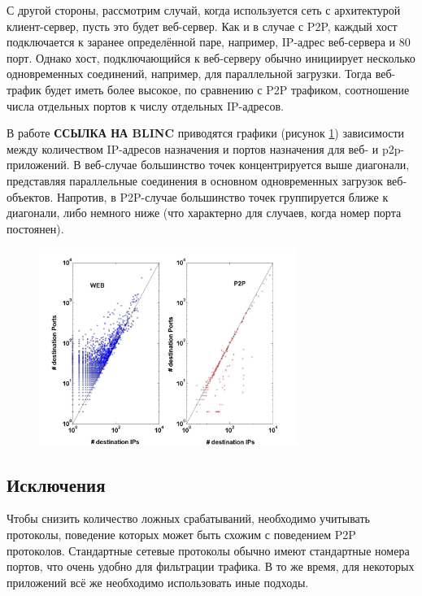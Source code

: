 \documentclass[bachelor, och, coursework]{SCWorks}
\begin{document}
С другой стороны, рассмотрим случай, когда используется сеть с архитектурой клиент-сервер, пусть это будет веб-сервер. Как и в случае с P2P, каждый хост подключается к заранее определённой паре, например, IP-адрес веб-сервера и 80 порт. Однако хост, подключающийся к веб-серверу обычно инициирует несколько одновременных соединений, например, для параллельной загрузки. Тогда веб-трафик будет иметь более высокое, по сравнению с P2P трафиком, соотношение числа отдельных портов к числу отдельных IP-адресов.

В работе \textbf{ССЫЛКА НА BLINC} приводятся графики (рисунок \ref{IPPort4.jpg}) зависимости между количеством IP-адресов назначения и портов назначения для веб- и p2p-приложений. В веб-случае большинство точек концентрируется выше диагонали, представляя параллельные соединения в основном одновременных загрузок веб-объектов. Напротив, в P2P-случае большинство точек группируется ближе к диагонали, либо немного ниже (что характерно для случаев, когда номер порта постоянен).

\begin{figure}[H]
    \centering
    \includegraphics[width=0.75\textwidth]{IPPort4.jpg}
    \caption{}
    \label{IPPort4.jpg}
\end{figure}


\subsection{Исключения}
Чтобы снизить количество ложных срабатываний, необходимо учитывать протоколы, поведение которых может быть схожим с поведением P2P протоколов. Стандартные сетевые протоколы обычно имеют стандартные номера портов, что очень удобно для фильтрации трафика. В то же время, для некоторых приложений всё же необходимо использовать иные подходы.
\end{document}
